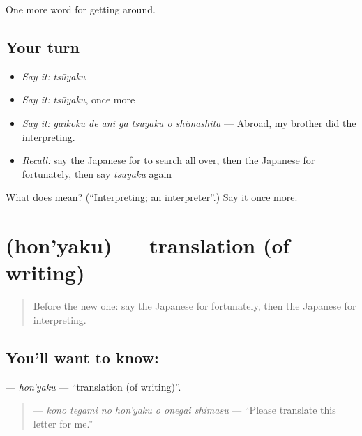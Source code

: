 \begin{grammarlens}[title={What you've built}]
One more word for getting around.
\end{grammarlens}

\subsection*{Your turn}
\begin{itemize}
\raggedright
  \item \emph{Say it:} \emph{tsūyaku}
  \item \emph{Say it:} \emph{tsūyaku}, once more
  \item \emph{Say it:} \emph{gaikoku de ani ga tsūyaku o shimashita} — Abroad, my brother did the interpreting.
  \item \emph{Recall:} say the Japanese for to search all over, then the Japanese for fortunately, then say \emph{tsūyaku} again
\end{itemize}

\begin{tcolorbox}[breakable,colback=teal!4,colframe=teal!35!black,title={Before you move on}]
What does  mean? (\textquotedblleft{}Interpreting; an interpreter\textquotedblright{}.) Say it once more.
\end{tcolorbox}
\section[\texorpdfstring{\ja{ほんやく} (hon'yaku)}{ほんやく (hon'yaku)}]{ (hon'yaku) — translation (of writing)}

\label{lesson:JA-C425-hon-yaku}



\begin{quote}
Before the new one: say the Japanese for fortunately, then the Japanese for interpreting.
\end{quote}

\subsection*{You'll want to know: }
\textbf{} — \emph{hon'yaku} — \textquotedblleft{}translation (of writing)\textquotedblright{}.

\begin{quote}
\textbf{   } — \emph{kono tegami no hon'yaku o onegai shimasu} — \textquotedblleft{}Please translate this letter for me.\textquotedblright{}
\end{quote}

